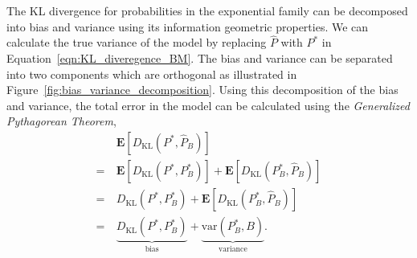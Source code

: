 \documentclass[letterpaper]{article} %
\begin{document}
		The KL divergence for probabilities in the exponential family can be decomposed into bias and variance using its information geometric properties. We can calculate the true variance of the model by replacing $\hat{P}$ with $P^*$ in Equation~\eqref{eqn:KL_diveregence_BM}. The bias and variance can be separated into two components which are orthogonal as illustrated in Figure~\ref{fig:bias_variance_decomposition}. Using this decomposition of the bias and variance, the total error in the model can be calculated using the \textit{Generalized Pythagorean Theorem},
		\begin{align*}
				&\mathbf{E} \left[ D_{\mathrm{KL}}  \left( P^{*}, \hat{P}_{B} \right) \right] \\
                =\ &\mathbf{E} \left[ D_{\mathrm{KL}} \left( P^{*}, P^{*}_{B} \right) \right] + \mathbf{E} \left[ D_{\mathrm{KL}} \left( P^{*}_{B}, \hat{P}_{B} \right) \right]\\
				=\ &D_{\mathrm{KL}} \left( P^{*}, P^{*}_{B} \right) + \mathbf{E} \left[ D_{\mathrm{KL}} \left( P^{*}_{B}, \hat{P}_{B} \right) \right] \\
				=\ &\underbrace{D_{\mathrm{KL}} \left( P^{*}, P^{*}_{B} \right)}_{\mathrm{bias}} + \underbrace{\mathrm{var} \left( P^{*}_B, B \right)}_{\mathrm{variance}}.
		\end{align*}
\end{document}
